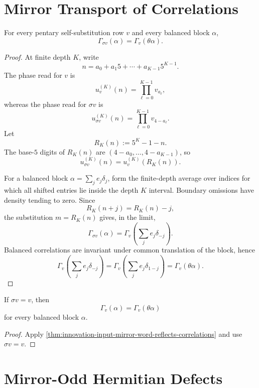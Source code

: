 \section{Mirror Transport of Correlations}
\label{sec:innovation-input-mirror-transport-correlations}

\begin{theorem}
\label{thm:innovation-input-mirror-word-reflects-correlations}
For every pentary self-substitution row $v$ and every balanced block
$\alpha$,
$$
\Gamma_{\sigma v}(\alpha)=\Gamma_v(\theta\alpha).
$$
\end{theorem}

\begin{proof}
At finite depth $K$, write
$$
n=a_0+a_1 5+\cdots+a_{K-1}5^{K-1}.
$$
The phase read for $v$ is
$$
u_v^{(K)}(n)=\prod_{\ell=0}^{K-1}v_{a_\ell},
$$
whereas the phase read for $\sigma v$ is
$$
u_{\sigma v}^{(K)}(n)
=
\prod_{\ell=0}^{K-1}v_{4-a_\ell}.
$$
Let
$$
R_K(n):=5^K-1-n.
$$
The base-$5$ digits of $R_K(n)$ are $(4-a_0,\ldots,4-a_{K-1})$, so
$$
u_{\sigma v}^{(K)}(n)=u_v^{(K)}(R_K(n)).
$$

For a balanced block $\alpha=\sum_j e_j\delta_j$, form the finite-depth
average over indices for which all shifted entries lie inside the depth
$K$ interval. Boundary omissions have density tending to zero. Since
$$
R_K(n+j)=R_K(n)-j,
$$
the substitution $m=R_K(n)$ gives, in the limit,
$$
\Gamma_{\sigma v}(\alpha)
=
\Gamma_v\left(\sum_j e_j\delta_{-j}\right).
$$
Balanced correlations are invariant under common translation of the
block, hence
$$
\Gamma_v\left(\sum_j e_j\delta_{-j}\right)
=
\Gamma_v\left(\sum_j e_j\delta_{1-j}\right)
=
\Gamma_v(\theta\alpha).
$$
\end{proof}

\begin{corollary}
\label{cor:innovation-input-palindromy-gives-reflection-evenness}
If $\sigma v=v$, then
$$
\Gamma_v(\alpha)=\Gamma_v(\theta\alpha)
$$
for every balanced block $\alpha$.
\end{corollary}

\begin{proof}
Apply
\autoref{thm:innovation-input-mirror-word-reflects-correlations} and use
$\sigma v=v$.
\end{proof}

\section{Mirror-Odd Hermitian Defects}
\label{sec:innovation-input-mirror-odd-hermitian-defects}

